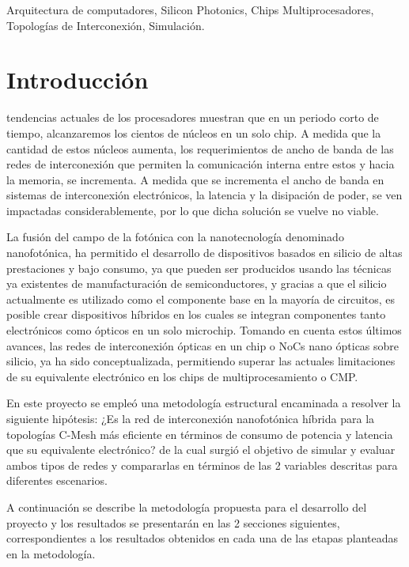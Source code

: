 \documentclass{IEEEtran}
\begin{document}
\begin{IEEEkeywords}
 Arquitectura de computadores, Silicon Photonics,
Chips Multiprocesadores, Topologías de Interconexión, Simulación.
\end{IEEEkeywords}

\section{Introducción}
 tendencias actuales de los procesadores muestran 
que en un periodo corto de tiempo, 
alcanzaremos los cientos de núcleos en un solo chip. 
A medida que la cantidad de estos núcleos aumenta, los requerimientos de ancho de banda 
de las redes de interconexión que permiten la comunicación interna entre estos y 
hacia la memoria, se incrementa. A medida que se incrementa el ancho de banda en 
sistemas de interconexión electrónicos, la latencia y la disipación de poder, 
se ven impactadas considerablemente, por lo que dicha solución se vuelve no viable.

La fusión del campo de la fotónica con la nanotecnología denominado 
nanofotónica, ha permitido el desarrollo de dispositivos
basados en silicio de altas prestaciones y bajo consumo, ya que pueden 
ser producidos usando las técnicas ya existentes de manufacturación de semiconductores, 
y gracias a que el silicio actualmente es utilizado como el componente base 
en la mayoría de circuitos, es posible crear dispositivos híbridos en los cuales 
se integran componentes tanto electrónicos como ópticos en un solo microchip. 
Tomando en cuenta estos últimos avances, las redes de interconexión ópticas 
en un chip o NoCs nano ópticas sobre silicio, ya ha sido conceptualizada, 
permitiendo superar las actuales limitaciones de su equivalente electrónico 
en los chips de multiprocesamiento o CMP.

En este proyecto se empleó una metodología estructural encaminada a resolver
la siguiente hipótesis: ¿Es la red de interconexión nanofotónica híbrida para la
topologías C-Mesh más eficiente en términos de consumo de potencia
 y latencia que su equivalente electrónico? de la cual surgió el objetivo de
simular y evaluar ambos tipos de redes y compararlas en términos de las
2 variables descritas para diferentes escenarios.

A continuación se describe la metodología propuesta para el desarrollo del
proyecto y los resultados se presentarán en las 2 secciones siguientes, correspondientes a 
los resultados obtenidos en cada una de las etapas planteadas en la metodología.
\end{document}
